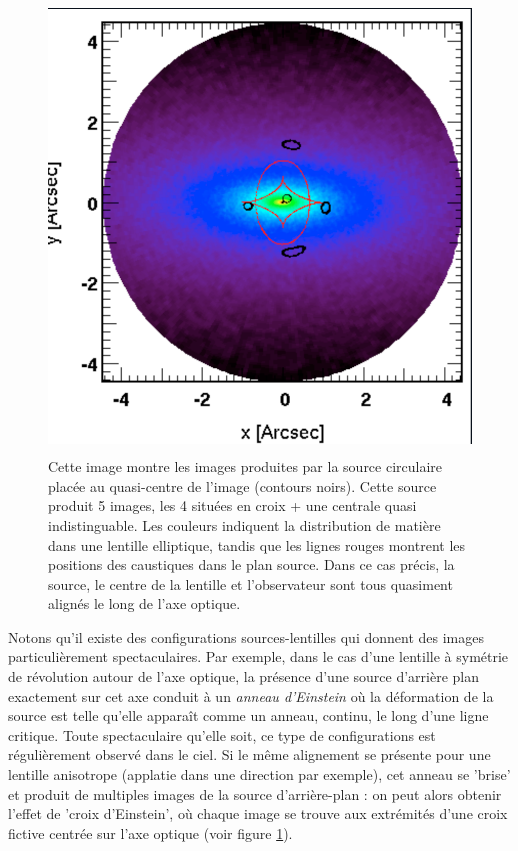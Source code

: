 \begin{figure}[htbp]
	\centering
		\includegraphics[height=12cm]{figs/SPL.png}
	\caption[Exemple de calcul de lentilles gravitationnelles]{Cette image montre les images produites par la source circulaire placée au quasi-centre de l'image (contours noirs). Cette source produit 5 images, les 4 situées en croix + une centrale quasi indistinguable. Les couleurs indiquent la distribution de matière dans une lentille elliptique, tandis que les lignes rouges montrent les positions des caustiques dans le plan source. Dans ce cas précis, la source, le centre de la lentille et l'observateur sont tous quasiment alignés le long de l'axe optique.} 
	\label{f:SPL}
\end{figure}

Notons qu'il existe des configurations sources-lentilles qui donnent des images particulièrement spectaculaires. Par exemple, dans le cas d'une lentille à symétrie de révolution autour de l'axe optique, la présence d'une source d'arrière plan exactement sur cet axe conduit à un \textit{anneau d'Einstein} où la déformation de la source est telle qu'elle apparaît comme un anneau, continu, le long d'une ligne critique. Toute spectaculaire qu'elle soit, ce type de configurations est régulièrement observé dans le ciel. Si le même alignement se présente pour une lentille anisotrope (applatie dans une direction par exemple), cet anneau se 'brise' et produit de multiples images de la source d'arrière-plan : on peut alors obtenir l'effet de 'croix d'Einstein', où chaque image se trouve aux extrémités d'une croix fictive centrée sur l'axe optique (voir figure \ref{f:SPL}).


